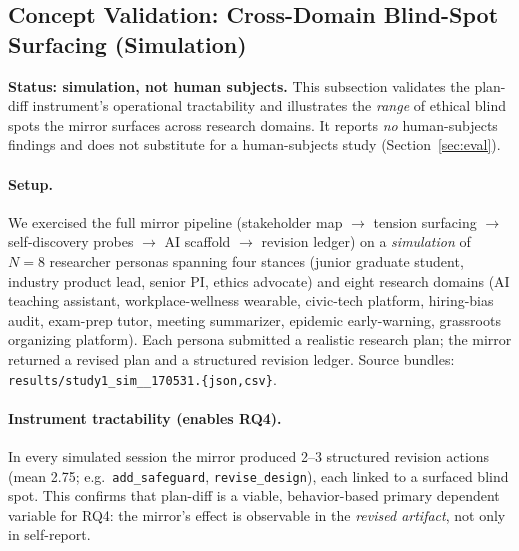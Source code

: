 
\subsection{Concept Validation: Cross-Domain Blind-Spot Surfacing (Simulation)}
\label{sec:conceptval}

\textbf{Status: simulation, not human subjects.} This subsection validates
the plan-diff instrument's operational tractability and illustrates the
\emph{range} of ethical blind spots the mirror surfaces across research
domains. It reports \emph{no} human-subjects findings and does not
substitute for a human-subjects study (Section~\ref{sec:eval}).

\paragraph{Setup.}
We exercised the full mirror pipeline (stakeholder map $\rightarrow$
tension surfacing $\rightarrow$ self-discovery probes $\rightarrow$ AI
scaffold $\rightarrow$ revision ledger) on a \emph{simulation} of
$N=8$ researcher personas spanning four stances (junior graduate student,
industry product lead, senior PI, ethics advocate) and eight research
domains (AI teaching assistant, workplace-wellness wearable, civic-tech
platform, hiring-bias audit, exam-prep tutor, meeting summarizer, epidemic
early-warning, grassroots organizing platform). Each persona submitted a
realistic research plan; the mirror returned a revised plan and a
structured revision ledger. Source bundles:
\texttt{results/study1\_sim\_\_170531.\allowbreak \{json,csv\}}.

\paragraph{Instrument tractability (enables RQ4).}
In every simulated session the mirror produced 2--3 structured revision
actions (mean 2.75; e.g.\ \texttt{add\_safeguard},
\texttt{revise\_design}), each linked to a surfaced blind spot. This
confirms that plan-diff is a viable, behavior-based primary dependent
variable for RQ4: the mirror's effect is observable in the \emph{revised
artifact}, not only in self-report.

